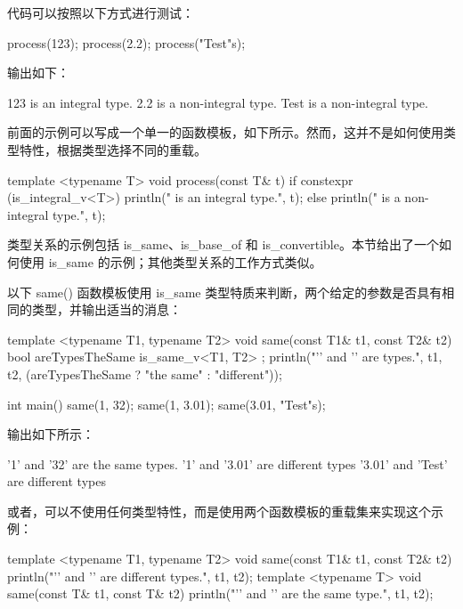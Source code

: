 代码可以按照以下方式进行测试：

\begin{cpp}
process(123);
process(2.2);
process("Test"s);
\end{cpp}

输出如下：

\begin{shell}
123 is an integral type.
2.2 is a non-integral type.
Test is a non-integral type.
\end{shell}

前面的示例可以写成一个单一的函数模板，如下所示。然而，这并不是如何使用类型特性，根据类型选择不同的重载。

\begin{cpp}
template <typename T>
void process(const T& t)
{
    if constexpr (is_integral_v<T>) {
        println("{} is an integral type.", t);
    } else {
        println("{} is a non-integral type.", t);
    }
}
\end{cpp}



类型关系的示例包括 is\_same、is\_base\_of 和 is\_convertible。本节给出了一个如何使用 is\_same 的示例；其他类型关系的工作方式类似。

以下 same() 函数模板使用 is\_same 类型特质来判断，两个给定的参数是否具有相同的类型，并输出适当的消息：

\begin{cpp}
template <typename T1, typename T2>
void same(const T1& t1, const T2& t2)
{
    bool areTypesTheSame { is_same_v<T1, T2> };
    println("'{}' and '{}' are {} types.", t1, t2,
    (areTypesTheSame ? "the same" : "different"));
}

int main()
{
    same(1, 32);
    same(1, 3.01);
    same(3.01, "Test"s);
}
\end{cpp}

输出如下所示：

\begin{shell}
'1' and '32' are the same types.
'1' and '3.01' are different types
'3.01' and 'Test' are different types
\end{shell}

或者，可以不使用任何类型特性，而是使用两个函数模板的重载集来实现这个示例：

\begin{cpp}
template <typename T1, typename T2>
void same(const T1& t1, const T2& t2)
{
    println("'{}' and '{}' are different types.", t1, t2);
}
template <typename T>
void same(const T& t1, const T& t2)
{
    println("'{}' and '{}' are the same type.", t1, t2);
}
\end{cpp}

